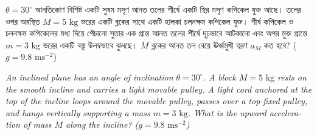 \documentclass[12pt, a4paper]{article}
\begin{document}
\begin{tcolorbox}[questionbox={প্রশ্ন (Question) 4}]
\noindent
$\theta = 30^\circ$ আনতিকোণ বিশিষ্ট একটি সুষম মসৃণ আনত তলের শীর্ষে একটি স্থির মসৃণ কপিকেল যুক্ত আছে। তলের ওপর অবস্থিত $M = 5\text{ kg}$ ভরের একটি ব্লকের সাথে একটি হালকা চলনক্ষম কপিকেল যুক্ত। শীর্ষ কপিকেল ও চলনক্ষম কপিকেলের মধ্য দিয়ে পেঁচানো সুতার এক প্রান্ত আনত তলের শীর্ষে দৃঢ়ভাবে আটকানো এবং অপর মুক্ত প্রান্তে $m = 3\text{ kg}$ ভরের একটি বস্তু উলম্বভাবে ঝুলছে। $M$ ব্লকের আনত তল বেয়ে ঊর্ধ্বমুখী ত্বরণ $a_M$ কত হবে? ($g = 9.8\text{ ms}^{-2}$)
\vspace{0.8em}
\begin{english}
\noindent\textit{\color{darkgray}
An inclined plane has an angle of inclination $\theta = 30^\circ$. A block $M = 5\text{ kg}$ rests on the smooth incline and carries a light movable pulley. A light cord anchored at the top of the incline loops around the movable pulley, passes over a top fixed pulley, and hangs vertically supporting a mass $m = 3\text{ kg}$. What is the upward acceleration of mass $M$ along the incline? ($g = 9.8\text{ ms}^{-2}$)
}
\end{english}
\end{tcolorbox}
\end{document}
